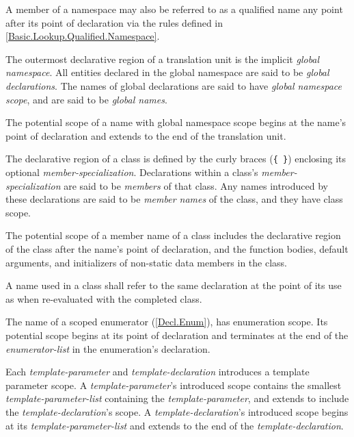 \p A member of a namespace may also be referred to as a qualified name any point
after its point of declaration via the rules defined in
\ref{Basic.Lookup.Qualified.Namespace}.

\p The outermost declarative region of a translation unit is the implicit
\textit{global namespace}. All entities declared in the global namespace are
said to be \textit{global declarations}. The names of global declarations are
said to have \textit{global namespace scope}, and are said to be \textit{global
names}.

\p The potential scope of a name with global namespace scope begins at the
name's point of declaration and extends to the end of the translation unit.


\p The declarative region of a class is defined by the curly braces (\texttt{\{
\}}) enclosing its optional \textit{member-specialization}. Declarations within
a class's \textit{member-specialization} are said to be \textit{members} of that
class. Any names introduced by these declarations are said to be \textit{member
names} of the class, and they have class scope.

\p The potential scope of a member name of a class includes the declarative
region of the class after the name's point of declaration, and the function
bodies, default arguments, and initializers of non-static data members in the
class.

\p A name used in a class shall refer to the same declaration at the point of
its use as when re-evaluated with the completed class.


\p The name of a scoped enumerator (\ref{Decl.Enum}), has enumeration scope.
Its potential scope begins at its point of declaration and terminates at the
end of the \textit{enumerator-list} in the enumeration's declaration.


\p Each \textit{template-parameter} and \textit{template-declaration} introduces
a template parameter scope. A \textit{template-parameter}'s introduced scope
contains the smallest \textit{template-parameter-list} containing the
\textit{template-parameter}, and extends to include the
\textit{template-declaration}'s scope. A \textit{template-declaration}'s
introduced scope begins at its \textit{template-parameter-list} and extends to
the end of the \textit{template-declaration}.

